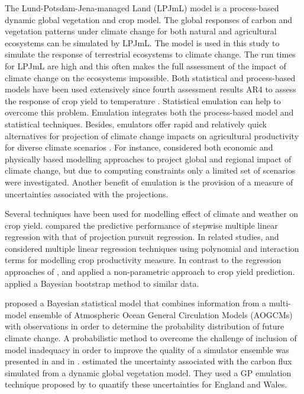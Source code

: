 The Lund-Potsdam-Jena-managed Land (LPJmL) model is a process-based dynamic global vegetation and crop model. The global responses of carbon and vegetation patterns under climate change for both natural and agricultural ecosystems can be simulated by LPJmL. The model is used in this study to simulate the response of terrestrial ecosystems to climate change. The run times for LPJmL are high and this often makes the full assessment of the impact of climate change on the ecosystems impossible. Both statistical and process-based models have been used extensively since fourth assessment results AR4 to assess the response of crop yield to temperature \citep{ipc14}.
Statistical emulation can help to overcome this problem. Emulation integrates both the process-based model and statistical techniques. Besides, emulators offer rapid and relatively quick alternatives for projection of climate change impacts on agricultural productivity for diverse climate scenarios \citep{qwole}. For instance, \cite{q101,q102} considered both economic and physically based modelling approaches to project global and regional impact of climate change, but due to computing constraints only a limited set of scenarios were investigated. Another benefit of emulation is the provision of a measure of uncertainties associated with the projections. 


Several techniques have been used for modelling effect of climate and weather on crop yield. 
\citet{r5} compared the predictive performance of stepwise multiple linear regression with that of projection pursuit regression. In related studies, \citet{r6} and \citet{r8} considered multiple linear regression techniques using polynomial and interaction terms for modelling crop productivity measure. In contrast to the regression approaches of \citet{r26,r6,r9},  \citet{r30} and \citet{r29} applied a non-parametric approach to crop yield prediction. \citet{r23} applied a Bayesian bootstrap method to similar data.

\cite{91,89} proposed a Bayesian statistical model that combines information from a multi-model ensemble of Atmospheric Ocean General Circulation Models (AOGCMs) with observations in order to determine the probability distribution of future climate change. A probabilistic method to overcome the challenge of inclusion of model inadequacy in order to improve the quality of a simulator ensemble was presented in \citet{46} and in \citet{68}. \citet{32} estimated the uncertainty associated with the carbon flux simulated from a dynamic global vegetation model. They used a GP emulation technique proposed by \cite{60} to quantify these uncertainties for England and Wales.

